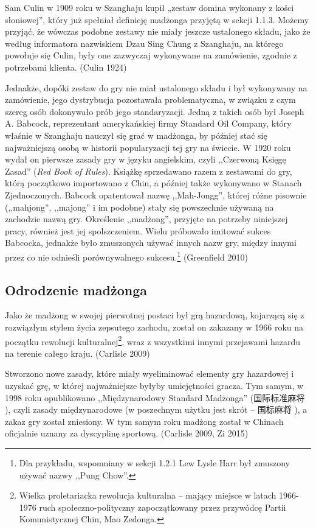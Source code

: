 Sam Culin w 1909 roku w Szanghaju kupił „zestaw
domina wykonany z kości słoniowej”, który już spełniał definicję madżonga
przyjętą w sekcji 1.1.3. Możemy przyjąć, że wówczas podobne zestawy nie miały
jeszcze ustalonego składu, jako że według informatora nazwiskiem Dzau Sing
Chung z Szanghaju, na którego powołuje się Culin, były one
zazwyczaj wykonywane na zamówienie, zgodnie z potrzebami klienta. (Culin 1924)

Jednakże, dopóki zestaw do gry nie miał ustalonego składu i był wykonywany na
zamówienie, jego dystrybucja pozostawała problematyczna, w związku z czym szereg
osób dokonywało prób jego standaryzacji. Jedną z takich osób był Joseph A.
Babcock, reprezentant amerykańskiej firmy Standard Oil Company, który właśnie w
Szanghaju nauczył się grać w madżonga, by później
stać się najważniejszą osobą w historii popularyzacji tej gry na świecie. W
1920 roku wydał on pierwsze zasady gry w języku
angielskim, czyli ,,Czerwoną Księgę Zasad'' (\textit{Red Book of Rules}).
Książkę sprzedawano razem z zestawami do gry, którą początkowo importowano z
Chin, a później także wykonywano w Stanach Zjednoczonych. Babcock opatentował
nazwę ,,Mah-Jongg'', której różne pisownie (,,mahjong'', ,,majong'' i im
podobne) stały się powszechnie używaną na zachodzie nazwą gry. Określenie
,,madżong'', przyjęte na potrzeby niniejszej pracy, również jest jej
spolszczeniem. Wielu próbowało imitować sukces Babcocka, jednakże było
zmuszonych używać innych nazw gry, między innymi przez co nie odnieśli
porównywalnego sukcesu.\footnote{Dla przykładu, wspomniany w sekcji 1.2.1 Lew
Lysle Harr był zmuszony używać nazwy ,,Pung Chow''.} (Greenfield 2010)

\subsection{Odrodzenie madżonga}
Jako że madżong w swojej pierwotnej postaci był grą hazardową, kojarzącą się z
rozwiązłym stylem życia zepsutego zachodu, został on zakazany w 1966 roku na
początku rewolucji kulturalnej\footnote{Wielka proletariacka rewolucja
kulturalna – mający miejsce w latach 1966-1976 ruch społeczno-polityczny
zapoczątkowany przez przywódcę Partii Komunistycznej Chin, Mao Zedonga.}, wraz z
wszystkimi innymi przejawami hazardu na terenie całego kraju.
(Carlisle 2009)

Stworzono nowe zasady, które miały wyeliminować elementy gry hazardowej i
uzyskać grę, w której najważniejsze byłyby umiejętności gracza. Tym samym, w
1998 roku opublikowano ,,Międzynarodowy Standard Madżonga'' (国际标准麻将
), czyli zasady międzynarodowe (w poszechnym użytku jest skrót
-- 国标麻将 ), a zakaz gry został zniesiony. W tym samym
roku madżong został w Chinach oficjalnie uznany za dyscyplinę sportową.
(Carlisle 2009, Zi 2015)

